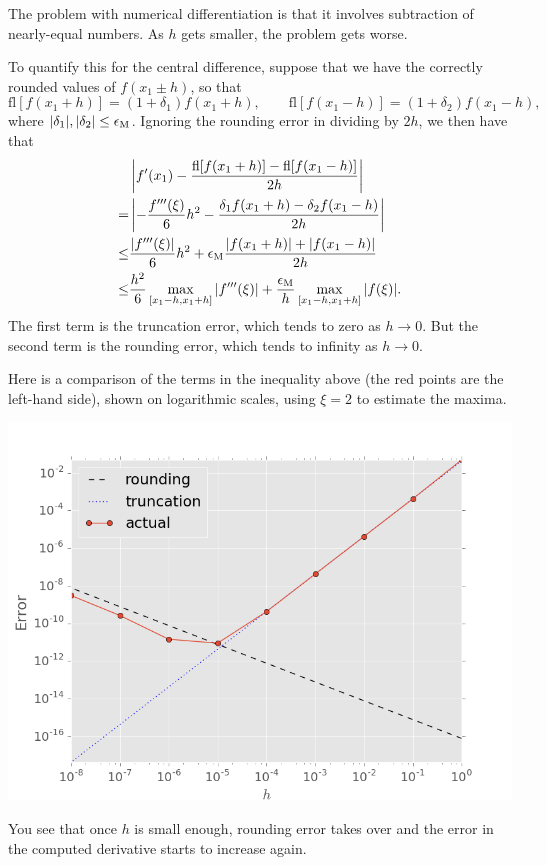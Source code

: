 \documentclass[
  letterpaper,
  DIV=11,
  numbers=noendperiod]{scrreprt}
\newenvironment{fbxSimple}[3]{\begin{tcolorbox}[enhanced, breakable,%
attach boxed title to top*={xshift=1.4pt},
boxed title style={boxrule=0.0mm, fuzzy shadow={1pt}{-1pt}{0mm}{0.1mm}{gray}, arc=.3em, rounded corners=east, sharp corners=west}, colframe=#1-color2, colbacktitle=#1-color1, colback = white, coltitle=black,  titlerule=0mm, toprule=0pt, bottomrule=.7pt, leftrule=.3em, rightrule=.7pt, outer arc=.3em,  	left=.5em, right=.5em, bottomtitle=1mm, toptitle=1mm,title=\textbf{#2}\hspace{0.5em}{#3}]}
{\end{tcolorbox}}
\begin{document}
The problem with numerical differentiation is that it involves
subtraction of nearly-equal numbers. As \(h\) gets smaller, the problem
gets worse.

To quantify this for the central difference, suppose that we have the
correctly rounded values of \(f(x_1\pm h)\), so that \[
\text{fl}[f(x_1+h)] = (1+\delta_1)f(x_1+h),\qquad
\text{fl}[f(x_1-h)]=(1+\delta_2)f(x_1-h),
\] where \(|\delta_1|,|\delta_2|\leq \epsilon_{\rm M}\). Ignoring the
rounding error in dividing by \(2h\), we then have that \[
\begin{aligned}
&\left| f'(x_1) - \frac{\text{fl}[f(x_1+h)] - \text{fl}[f(x_1-h)]}{2h}\right| \\ = &\left| - \frac{f'''(\xi)}{6}h^2 - \frac{\delta_1f(x_1+h) - \delta_2f(x_1-h)}{2h}\right|\\
\leq &\frac{|f'''(\xi)|}{6}h^2 + \epsilon_{\rm M}\frac{|f(x_1+h)| + |f(x_1-h)|}{2h}\\
\leq &\frac{h^2}{6}\max_{[x_1-h, x_1+h]} |f'''(\xi)| + \frac{\epsilon_{\rm M}}{h}\max_{[x_1-h, x_1+h]}|f(\xi)|.
\end{aligned}
\] The first term is the truncation error, which tends to zero as
\(h\to 0\). But the second term is the rounding error, which tends to
infinity as \(h\to 0\).

\label{derivative-of-fxlogx-at-x2-again}
\begin{fbxSimple}{eg}{Example 4.4: }{Derivative of \(f(x)=\log(x)\) at \(x=2\) again}
\label{derivative-of-fxlogx-at-x2-again}
Here is a comparison of the terms in the inequality above (the red
points are the left-hand side), shown on logarithmic scales, using
\(\xi=2\) to estimate the maxima.

\begin{center}
\includegraphics[width=0.6\linewidth,height=\textheight,keepaspectratio]{im/diffrounding.png}
\end{center}

You see that once \(h\) is small enough, rounding error takes over and
the error in the computed derivative starts to increase again.

\end{fbxSimple}
\end{document}
